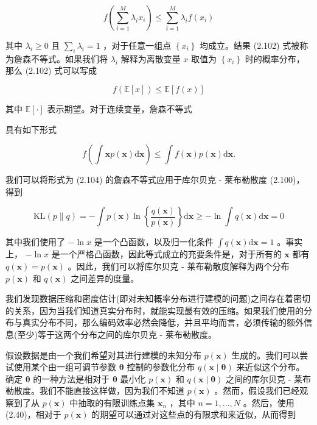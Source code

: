 \documentclass[10pt]{article}
\begin{document}
\[
f\left( {\mathop{\sum }\limits_{{i = 1}}^{M}{\lambda }_{i}{x}_{i}}\right)  \leq  \mathop{\sum }\limits_{{i = 1}}^{M}{\lambda }_{i}f\left( {x}_{i}\right)  \tag{2.102}
\]

其中 \({\lambda }_{i} \geq  0\) 且 \(\mathop{\sum }\limits_{i}{\lambda }_{i} = 1\) ，对于任意一组点 \(\left\{  {x}_{i}\right\}\) 均成立。结果 (2.102) 式被称为詹森不等式。如果我们将 \({\lambda }_{i}\) 解释为离散变量 \(x\) 取值为 \(\left\{  {x}_{i}\right\}\) 时的概率分布，那么 (2.102) 式可以写成

\[
f\left( {\mathbb{E}\left\lbrack  x\right\rbrack  }\right)  \leq  \mathbb{E}\left\lbrack  {f\left( x\right) }\right\rbrack   \tag{2.103}
\]

其中 \(\mathbb{E}\left\lbrack  \cdot \right\rbrack\) 表示期望。对于连续变量，詹森不等式

具有如下形式

\[
f\left( {\int \mathbf{x}p\left( \mathbf{x}\right) \mathrm{d}\mathbf{x}}\right)  \leq  \int f\left( \mathbf{x}\right) p\left( \mathbf{x}\right) \mathrm{d}\mathbf{x}. \tag{2.104}
\]

我们可以将形式为 (2.104) 的詹森不等式应用于库尔贝克 - 莱布勒散度 (2.100)，得到

\[
\mathrm{{KL}}\left( {p\parallel q}\right)  =  - \int p\left( \mathbf{x}\right) \ln \left\{  \frac{q\left( \mathbf{x}\right) }{p\left( \mathbf{x}\right) }\right\}  \mathrm{d}\mathbf{x} \geq   - \ln \int q\left( \mathbf{x}\right) \mathrm{d}\mathbf{x} = 0 \tag{2.105}
\]

其中我们使用了 \(- \ln x\) 是一个凸函数，以及归一化条件 \(\int q\left( \mathbf{x}\right) \mathrm{d}\mathbf{x} = 1\) 。事实上， \(- \ln x\) 是一个严格凸函数，因此等式成立的充要条件是，对于所有的 \(\mathbf{x}\) 都有 \(q\left( \mathbf{x}\right)  = p\left( \mathbf{x}\right)\) 。因此，我们可以将库尔贝克 - 莱布勒散度解释为两个分布 \(p\left( \mathbf{x}\right)\) 和 \(q\left( \mathbf{x}\right)\) 之间差异的度量。

我们发现数据压缩和密度估计(即对未知概率分布进行建模的问题)之间存在着密切的关系，因为当我们知道真实分布时，就能实现最有效的压缩。如果我们使用的分布与真实分布不同，那么编码效率必然会降低，并且平均而言，必须传输的额外信息(至少)等于这两个分布之间的库尔贝克 - 莱布勒散度。

假设数据是由一个我们希望对其进行建模的未知分布 \(p\left( \mathbf{x}\right)\) 生成的。我们可以尝试使用某个由一组可调节参数 \(\mathbf{\theta }\) 控制的参数化分布 \(q\left( {\mathbf{x} \mid  \mathbf{\theta }}\right)\) 来近似这个分布。确定 \(\mathbf{\theta }\) 的一种方法是相对于 \(\mathbf{\theta }\) 最小化 \(p\left( \mathbf{x}\right)\) 和 \(q\left( {\mathbf{x} \mid  \mathbf{\theta }}\right)\) 之间的库尔贝克 - 莱布勒散度。我们不能直接这样做，因为我们不知道 \(p\left( \mathbf{x}\right)\) 。然而，假设我们已经观察到了从 \(p\left( \mathbf{x}\right)\) 中抽取的有限训练点集 \({\mathbf{x}}_{n}\) ，其中 \(n = 1,\ldots ,N\) 。然后，使用 (2.40)，相对于 \(p\left( \mathbf{x}\right)\) 的期望可以通过对这些点的有限求和来近似，从而得到
\end{document}
